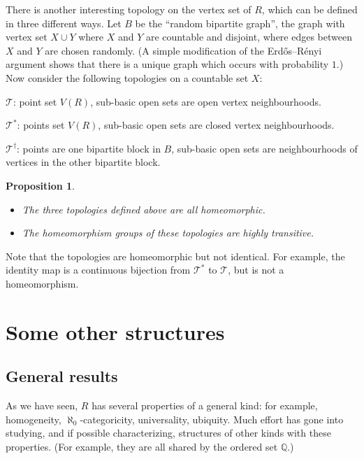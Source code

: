 \documentclass{book}
\newtheorem{proposition}{Proposition}
\begin{document}
There is another interesting topology on the vertex set of $R$, which can be
defined in three different ways. Let $B$ be the ``random bipartite graph'',
the graph with vertex set $X\cup Y$ where $X$ and $Y$ are countable and
disjoint, where edges between $X$ and $Y$ are chosen randomly. (A simple
modification of the Erd\H{o}s--R\'enyi argument shows that there is a unique
graph which occurs with probability $1$.) Now consider the following
topologies on a countable set $X$:
\begin{description}
\item{$\mathcal{T}$:} point set $V(R)$, sub-basic open sets are
open vertex neighbourhoods.
\item{$\mathcal{T}^*$:} points set $V(R)$, sub-basic open sets are
closed vertex neighbourhoods.
\item{$\mathcal{T}^\dag$:} points are one bipartite block in $B$, sub-basic
open sets are neighbourhoods of vertices in the other bipartite block.
\end{description}

\begin{proposition}
\begin{itemize}
\item[(a)] The three topologies defined above are all homeomorphic.
\item[(b)] The homeomorphism groups of these topologies are highly transitive.
\end{itemize}
\end{proposition}

Note that the topologies are homeomorphic but not identical. For example,
the identity map is a continuous bijection from $\mathcal{T}^*$ to
$\mathcal{T}$, but is not a homeomorphism.

\section{Some other structures}%
\label{ch32:sec2.10}

\subsection{General results}

As we have seen, $R$ has several properties of a general kind: for
example, homogeneity, $\aleph_0$-categoricity, universality,
ubiquity. Much effort has gone into studying, and if possible
characterizing, structures of other kinds with these properties.
(For example, they are all shared by the ordered set $\mathbb{Q}$.)
\end{document}
